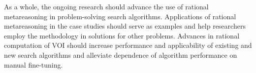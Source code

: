 As a whole, the ongoing research should advance the use of rational
metareasoning in problem-solving search algorithms. Applications of
rational metareasoning in the case studies should serve as examples
and help researchers employ the methodology in solutions for other
problems. Advances in rational computation of VOI should increase
performance and applicability of existing and new search algorithms
and alleviate dependence of algorithm performance on manual
fine-tuning.